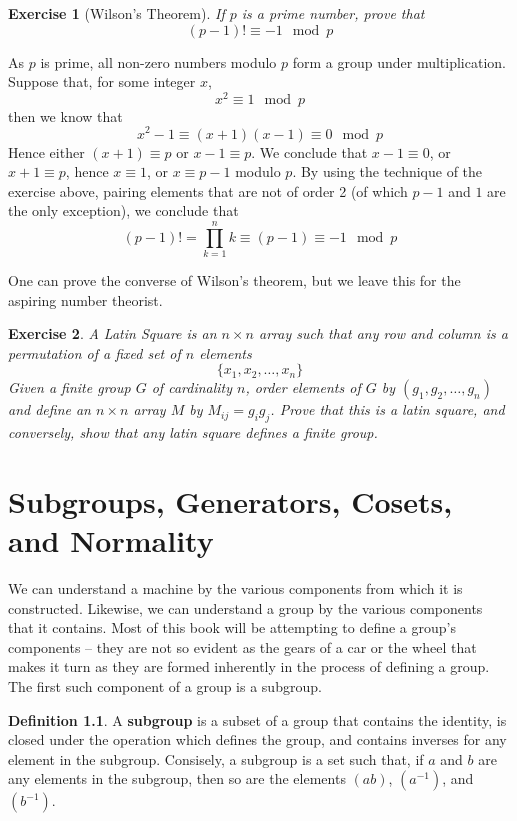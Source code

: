 \documentclass[12pt]{amsbook}
\makeatletter
\theoremstyle{plain}
\newtheorem{exercise}{Exercise}
\theoremstyle{definition}
\newtheorem{definition}{Definition}
\renewenvironment{proof}[1][\proofname]{\par
  \pushQED{\qed}%
  \normalfont \topsep6\p@\@plus6\p@\relax
  \list{}{\leftmargin=0em
          \rightmargin=\leftmargin
          \settowidth{\itemindent}{\itshape#1}%
          \labelwidth=\itemindent}

  \item[\hskip\labelsep
        \itshape
    #1\@addpunct{.}]\ignorespaces
}{%
  \popQED\endlist\@endpefalse
}
\makeatother
\begin{document}
\begin{exercise}[Wilson's Theorem] 
    If $p$ is a prime number, prove that
    \[ (p - 1)! \equiv -1 \mod{p} \]
\end{exercise}
\begin{proof}
    As $p$ is prime, all non-zero numbers modulo $p$ form a group under multiplication. Suppose that, for some integer $x$,
    \[ x^2 \equiv 1 \mod{p} \]
    then we know that
    \[ x^2 - 1 \equiv (x + 1)(x - 1) \equiv 0 \mod{p} \]
    Hence either $(x + 1) \equiv p$ or $x-1 \equiv p$. We conclude that $x - 1 \equiv 0$, or $x + 1 \equiv p$, hence $x \equiv 1$, or $x \equiv p - 1$ modulo $p$. By using the technique of the exercise above, pairing elements that are not of order 2 (of which $p - 1$ and $1$ are the only exception), we conclude that
    \[ (p - 1)! = \prod_{k = 1}^n k \equiv (p - 1) \equiv - 1 \mod{p}\]
\end{proof}

One can prove the converse of Wilson's theorem, but we leave this for the aspiring number theorist.

\begin{exercise}
    A Latin Square  is an $n \times n$ array such that any row and column is a permutation of a fixed set of $n$ elements
    \[ \{ x_1, x_2, \dots, x_n \} \]
    Given a finite group $G$ of cardinality $n$, order elements of $G$ by $(g_1, g_2, \dots, g_n)$ and define an $n \times n$ array $M$ by $M_{ij} = g_i g_j$. Prove that this is a latin square, and conversely, show that any latin square defines a finite group.
\end{exercise}





\chapter{Subgroups, Generators, Cosets, and Normality}

We can understand a machine by the various components from which it is constructed. Likewise, we can understand a group by the various components that it contains. Most of this book will be attempting to define a group's components -- they are not so evident as the gears of a car or the wheel that makes it turn as they are formed inherently in the process of defining a group. The first such component of a group is a subgroup.

\begin{definition}
A {\bf subgroup}  is a subset of a group that contains the identity, is closed under the operation which defines the group, and contains inverses for any element in the subgroup. Consisely, a subgroup is a set such that, if $a$ and $b$ are any elements in the subgroup, then so are the elements $(ab)$, $(a^{-1})$, and $(b^{-1})$.
\end{definition}
\end{document}
